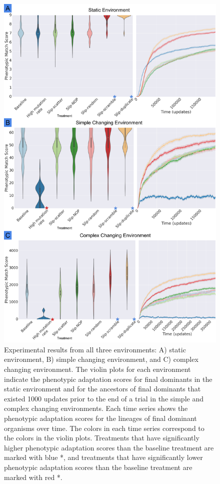 \begin{figure}[!h]
  \includegraphics[width=\columnwidth]{imgs/results_panels.png}
  \caption{\small Experimental results from all three environments: A) static environment, B) simple changing environment, and C) complex changing environment. The violin plots for each environment indicate the phenotypic adaptation scores for final dominants in the static environment and for the ancestors of final dominants that existed 1000 updates prior to the end of a trial in the simple and complex changing environments. Each time series shows the phenotypic adaptation scores for the lineages of final dominant organisms over time. The colors in each time series correspond to the colors in the violin plots. Treatments that have significantly higher phenotypic adaptation scores than the baseline treatment are marked with blue *, and treatments that have significantly lower phenotypic adaptation scores than the baseline treatment are marked with red *.  }
  \label{fig:results_panels}
\end{figure}
